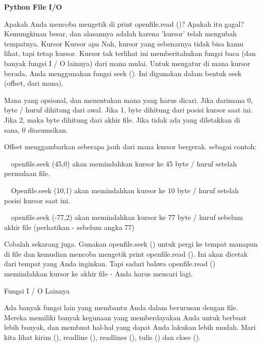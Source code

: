 \begin{center}{\fontsize{24pt}{24pt}\selectfont \textbf{Python File I/O} \\}
\vspace{12pt}
 
Apakah Anda mencoba mengetik di print openfile.read ()? Apakah itu gagal? Kemungkinan besar, dan alasannya adalah karena 'kursor' telah mengubah tempatnya. Kursor Kursor apa Nah, kursor yang sebenarnya tidak bisa kamu lihat, tapi tetap kursor. Kursor tak terlihat ini memberitahukan fungsi baca (dan banyak fungsi I / O lainnya) dari mana mulai. Untuk mengatur di mana kursor berada, Anda menggunakan fungsi seek (). Ini digunakan dalam bentuk seek (offset, dari mana). 

\vspace{12pt}

Mana yang opsional, dan menentukan mana yang harus dicari. Jika darimana 0, byte / huruf dihitung dari awal. Jika 1, byte dihitung dari posisi kursor saat ini. Jika 2, maka byte dihitung dari akhir file. Jika tidak ada yang diletakkan di sana, 0 diasumsikan. 

\vspace{12pt}

Offset menggambarkan seberapa jauh dari mana kursor bergerak. sebagai contoh:

\vspace{12pt}
 
 $  $ $  $ $  $ $  $openfile.seek (45,0) akan memindahkan kursor ke 45 byte / huruf setelah permulaan file. 
 
 $  $ $  $ $  $ $  $Openfile.seek (10,1) akan memindahkan kursor ke 10 byte / huruf setelah posisi kursor saat ini. 
 
 $  $ $  $ $  $ $  $openfile.seek (-77,2) akan memindahkan kursor ke 77 byte / huruf sebelum akhir file (perhatikan - sebelum angka 77) 
 
\vspace{12pt}
 
Cobalah sekarang juga. Gunakan openfile.seek () untuk pergi ke tempat manapun di file dan kemudian mencoba mengetik print openfile.read (). Ini akan dicetak dari tempat yang Anda inginkan. Tapi sadari bahwa openfile.read () memindahkan kursor ke akhir file - Anda harus mencari lagi. 
\vspace{14pt}

Fungsi I / O Lainnya 

\vspace{12pt}

Ada banyak fungsi lain yang membantu Anda dalam berurusan dengan file. Mereka memiliki banyak kegunaan yang memberdayakan Anda untuk berbuat lebih banyak, dan membuat hal-hal yang dapat Anda lakukan lebih mudah. Mari kita lihat kirim (), readline (), readlines (), tulis () dan close (). 


\end{center}
